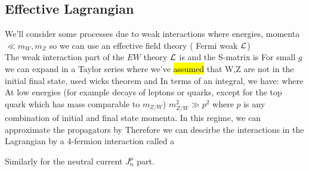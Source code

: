 \documentclass{article}
\begin{document}
\subsection{Effective Lagrangian}
We'll consider some processes due to weak interactions where energies, momenta $ \ll m_W, m_Z$ so we can use an effective field theory ( Fermi weak $\mathcal{L}$)\\
The weak interaction part of the $EW$ theory $\mathcal{L}$ is 
and the S-matrix is 
For small $g$ we can expand in a Taylor series 
where we've \hl{assumed} that W,Z are not in the initial final state, used wicks theorem and 
In terms of an integral, we have: 
where 
At low energies (for example decays of leptons or quarks, except for the top quark which has mass comparable to $m_{Z/W}$) $m_{Z/W}^2 \gg p^2$ where $p$ is any combination of initial and final state momenta. In this regime, we can approximate the propagators by 
Therefore we can descirbe the interactions in the Lagrangian by a 4-fermion interaction called a 

\begin{example}
Similarly for the neutral current $J_n^\mu$ part. 
\end{example}
\end{document}
